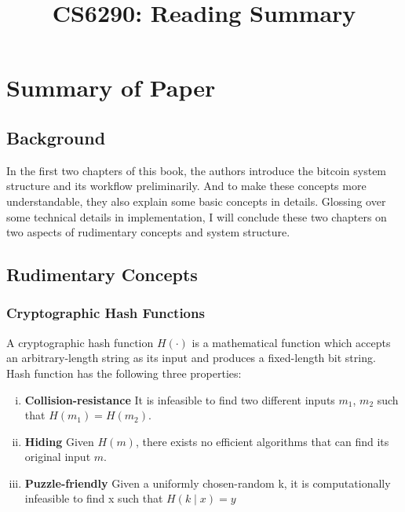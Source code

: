\documentclass[conference]{IEEEtran}
\begin{document}
\title{CS6290: Reading Summary}

\author{
}

\maketitle

\section{Summary of Paper\cite{cryptobook}}

\subsection{Background}
In the first two chapters of this book\cite{cryptobook}, the authors introduce the bitcoin system structure and its workflow preliminarily.
%
And to make these concepts more understandable, they also explain some basic concepts in details.
%
Glossing over some technical details in implementation, I will conclude these two chapters on two aspects of rudimentary concepts and system structure.

\subsection{Rudimentary Concepts}
\subsubsection{Cryptographic Hash Functions}
A cryptographic hash function $H(\cdot)$ is a mathematical function which accepts an arbitrary-length string as its input and produces a fixed-length bit string.
%
Hash function has the following three properties:

\begin{enumerate}[(i)]
    \item \textbf{Collision-resistance} It is infeasible to find two different inputs $m_{1}$, $m_{2}$ such that $H(m_1) = H(m_2)$.
    \item \textbf{Hiding} Given $H(m)$, there exists no efficient algorithms that can find its original input $m$.
    \item \textbf{Puzzle-friendly} Given a uniformly chosen-random k, it is computationally infeasible to find x such that $H(k \mid x) = y$ 
\end{enumerate}
\end{document}
